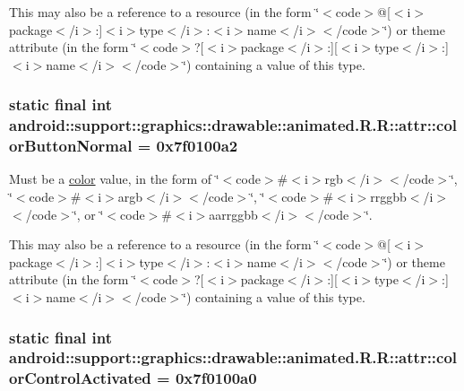 This may also be a reference to a resource (in the form \char`\"{}$<$code$>$@\mbox{[}$<$i$>$package$<$/i$>$:\mbox{]}$<$i$>$type$<$/i$>$:$<$i$>$name$<$/i$>$$<$/code$>$\char`\"{}) or theme attribute (in the form \char`\"{}$<$code$>$?\mbox{[}$<$i$>$package$<$/i$>$:\mbox{]}\mbox{[}$<$i$>$type$<$/i$>$:\mbox{]}$<$i$>$name$<$/i$>$$<$/code$>$\char`\"{}) containing a value of this type. \hypertarget{classandroid_1_1support_1_1graphics_1_1drawable_1_1animated_1_1_r_1_1attr_e4c5f9516b3f1c663f183705d9eed6b2}{
\subsubsection[{colorButtonNormal}]{\setlength{\rightskip}{0pt plus 5cm}static final int android::support::graphics::drawable::animated.R.R::attr::colorButtonNormal = 0x7f0100a2}}
\label{classandroid_1_1support_1_1graphics_1_1drawable_1_1animated_1_1_r_1_1attr_e4c5f9516b3f1c663f183705d9eed6b2}


Must be a \hyperlink{classandroid_1_1support_1_1graphics_1_1drawable_1_1animated_1_1_r_1_1color}{color} value, in the form of \char`\"{}$<$code$>$\#$<$i$>$rgb$<$/i$>$$<$/code$>$\char`\"{}, \char`\"{}$<$code$>$\#$<$i$>$argb$<$/i$>$$<$/code$>$\char`\"{}, \char`\"{}$<$code$>$\#$<$i$>$rrggbb$<$/i$>$$<$/code$>$\char`\"{}, or \char`\"{}$<$code$>$\#$<$i$>$aarrggbb$<$/i$>$$<$/code$>$\char`\"{}. 

This may also be a reference to a resource (in the form \char`\"{}$<$code$>$@\mbox{[}$<$i$>$package$<$/i$>$:\mbox{]}$<$i$>$type$<$/i$>$:$<$i$>$name$<$/i$>$$<$/code$>$\char`\"{}) or theme attribute (in the form \char`\"{}$<$code$>$?\mbox{[}$<$i$>$package$<$/i$>$:\mbox{]}\mbox{[}$<$i$>$type$<$/i$>$:\mbox{]}$<$i$>$name$<$/i$>$$<$/code$>$\char`\"{}) containing a value of this type. \hypertarget{classandroid_1_1support_1_1graphics_1_1drawable_1_1animated_1_1_r_1_1attr_1a38759503c34f55e40d9d5b334af231}{
\subsubsection[{colorControlActivated}]{\setlength{\rightskip}{0pt plus 5cm}static final int android::support::graphics::drawable::animated.R.R::attr::colorControlActivated = 0x7f0100a0}}
\label{classandroid_1_1support_1_1graphics_1_1drawable_1_1animated_1_1_r_1_1attr_1a38759503c34f55e40d9d5b334af231}


